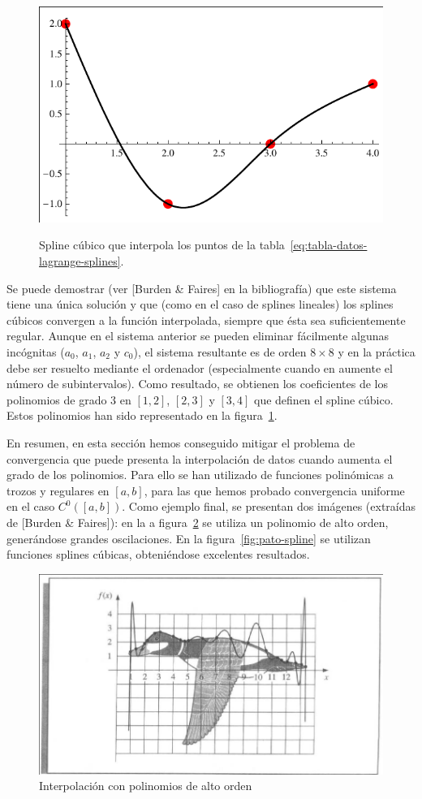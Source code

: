  \begin{figure}
   \centering
   \includegraphics[width=0.4\linewidth]{tema2/spline-cubico}
   \label{fig:spline-cubico} 
   \caption{Spline cúbico que interpola los puntos de la
     tabla~\ref{eq:tabla-datos-lagrange-splines}.}
 \end{figure}
 Se puede demostrar (ver [Burden \& Faires] en la bibliografía) que
 este sistema tiene una única solución y que (como en el caso de
 splines lineales) los splines cúbicos convergen a la función
 interpolada, siempre que ésta sea suficientemente regular. 
 Aunque en el sistema anterior se pueden eliminar fácilmente algunas
 incógnitas ($a_0$, $a_1$, $a_2$ y $c_0$), el sistema resultante
 es de orden $8\times 8$ y en la práctica debe ser resuelto mediante el
 ordenador (especialmente cuando en aumente el número de
 subintervalos). Como resultado, se obtienen los coeficientes de los
 polinomios de grado $3$ en $[1,2]$, $[2,3]$ y $[3,4]$ que definen el
 spline cúbico. Estos polinomios han sido representado en la
 figura~\ref{fig:spline-cubico}.


 En resumen, en esta sección hemos conseguido mitigar el problema de
 convergencia que puede presenta la interpolación de datos cuando
 aumenta el grado de los polinomios. Para ello se han utilizado de
 funciones polinómicas a trozos y regulares en $[a,b]$, para las que
 hemos probado convergencia uniforme en el caso $C^0([a,b])$. Como
 ejemplo final, se presentan dos imágenes (extraídas de [Burden \&
 Faires]): en la a figura~\ref{fig:pato-alto-orden} se utiliza un
 polinomio de alto orden, generándose grandes oscilaciones. En la
 figura~\ref{fig:pato-spline} se utilizan funciones splines cúbicas,
 obteniéndose excelentes resultados.

 \begin{figure}
   \centering
   \includegraphics[width=0.75\linewidth]{tema2/pato-interpol}
   \caption{Interpolación con polinomios de alto orden}
   \label{fig:pato-alto-orden}
 \end{figure}

